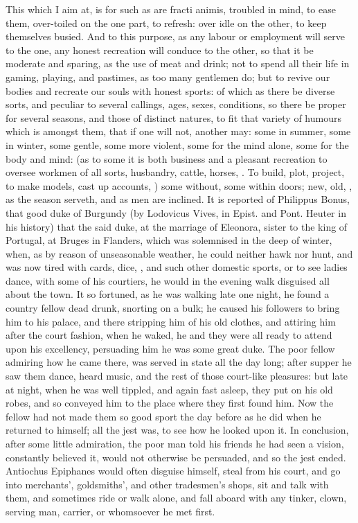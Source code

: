 {This which I aim at, is for such as are fracti animis, troubled in
mind, to ease them, over-toiled on the one part, to refresh: over idle
on the other, to keep themselves busied. And to this purpose, as any
labour or employment will serve to the one, any honest recreation will
conduce to the other, so that it be moderate and sparing, as the use of
meat and drink; not to spend all their life in gaming, playing, and
pastimes, as too many gentlemen do; but to revive our bodies and
recreate our souls with honest sports: of which as there be diverse
sorts, and peculiar to several callings, ages, sexes, conditions, so
there be proper for several seasons, and those of distinct natures, to
fit that variety of humours which is amongst them, that if one will
not, another may: some in summer, some in winter, some gentle, some
more violent, some for the mind alone, some for the body and mind: (as
to some it is both business and a pleasant recreation to oversee
workmen of all sorts, husbandry, cattle, horses, \etc{}. To build, plot,
project, to make models, cast up accounts, \etc{}) some without, some
within doors; new, old, \etc{}, as the season serveth, and as men are
inclined. It is reported of Philippus Bonus, that good duke of Burgundy
(by Lodovicus Vives, in Epist. and Pont. Heuter in his history)
that the said duke, at the marriage of Eleonora, sister to the king of
Portugal, at Bruges in Flanders, which was solemnised in the deep of
winter, when, as by reason of unseasonable weather, he could neither
hawk nor hunt, and was now tired with cards, dice, \etc{}, and such other
domestic sports, or to see ladies dance, with some of his courtiers, he
would in the evening walk disguised all about the town. It so fortuned,
as he was walking late one night, he found a country fellow dead drunk,
snorting on a bulk; he caused his followers to bring him to his
palace, and there stripping him of his old clothes, and attiring him
after the court fashion, when he waked, he and they were all ready to
attend upon his excellency, persuading him he was some great duke. The
poor fellow admiring how he came there, was served in state all the day
long; after supper he saw them dance, heard music, and the rest of
those court-like pleasures: but late at night, when he was well
tippled, and again fast asleep, they put on his old robes, and so
conveyed him to the place where they first found him. Now the fellow
had not made them so good sport the day before as he did when he
returned to himself; all the jest was, to see how he looked upon
it. In conclusion, after some little admiration, the poor man told his
friends he had seen a vision, constantly believed it, would not
otherwise be persuaded, and so the jest ended. Antiochus
Epiphanes would often disguise himself, steal from his court, and go
into merchants', goldsmiths', and other tradesmen's shops, sit and talk
with them, and sometimes ride or walk alone, and fall aboard with any
tinker, clown, serving man, carrier, or whomsoever he met first.

}
